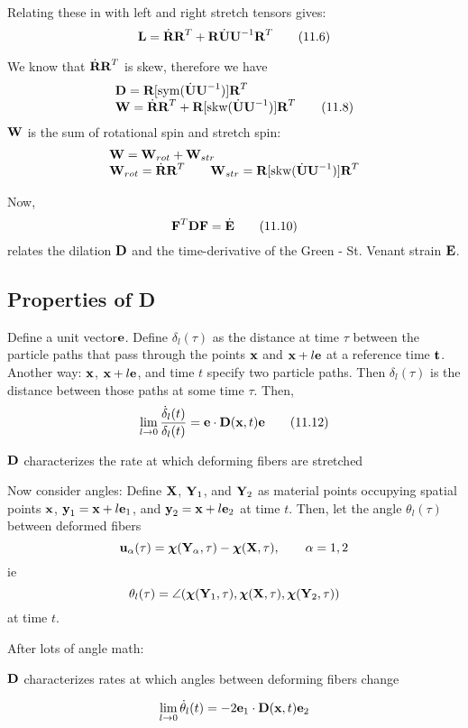 \documentclass{article}
\newcommand{\Chi}{\boldsymbol{\chi}}
\begin{document}
Relating these in with left and right stretch tensors gives:
\[
	\textbf{L} = \dot{\textbf{R}}\textbf{R}^T + \textbf{R}\dot{\textbf{U}}\textbf{U}^{-1}\textbf{R}^T\tag{11.6}
\]

We know that $\dot{\textbf{R}}\textbf{R}^T$ is skew, therefore we have
\[
\begin{array}{l}
	\textbf{D} = \textbf{R}[\text{sym}(\dot{\textbf{U}}\textbf{U}^{-1})]\textbf{R}^T\\
	\textbf{W} = \dot{\textbf{R}}\textbf{R}^T + \textbf{R}[\text{skw}(\dot{\textbf{U}}\textbf{U}^{-1})]\textbf{R}^T\tag{11.8}
\end{array}
\]
$\textbf{W}$ is the sum of rotational spin and stretch spin:
\[
\begin{array}{l}
	\textbf{W} = \textbf{W}_{rot} + \textbf{W}_{str}\\
	\textbf{W}_{rot} = \dot{\textbf{R}}\textbf{R}^T \qquad \textbf{W}_{str} = \textbf{R}[\text{skw}(\dot{\textbf{U}}\textbf{U}^{-1})]\textbf{R}^T
\end{array}
\]

Now,
\[
	\textbf{F}^T\textbf{D}\textbf{F} = \dot{\textbf{E}}\tag{11.10}
\]
relates the dilation $\textbf{D}$ and the time-derivative of the Green - St. Venant strain $\textbf{E}$.

\subsection{Properties of D}
Define a unit vector$\textbf{e}$. Define $\delta_l(\tau)$ as the distance at time $\tau$ between the particle paths that pass through the points $\textbf{x}$ and $\textbf{x} + l\textbf{e}$ at a reference time $\textbf{t}$. Another way: $\textbf{x}$, $\textbf{x} +l\textbf{e}$, and time $t$ specify two particle paths. Then $\delta_l(\tau)$ is the distance between those paths at some time $\tau$.
Then,
\[
	\lim\limits_{l\to 0}\frac{\dot{\delta}_l(t)}{\delta_l(t)} = \textbf{e}\cdot\textbf{D}(\textbf{x},t)\textbf{e}\tag{11.12}
\]
\begin{remark}
	$\textbf{D}$ characterizes the rate at which deforming fibers are stretched
\end{remark}

Now consider angles:
Define $\textbf{X}$, $\textbf{Y}_1$, and $\textbf{Y}_2$ as material points occupying spatial points $\textbf{x}$, $\textbf{y}_1= \textbf{x} + l\textbf{e}_1$, and $\textbf{y}_2 = \textbf{x} + l\textbf{e}_2$ at time $t$. Then, let the angle $\theta_l(\tau)$ between deformed fibers
\[
	\u_\alpha(\tau) = \Chi (\Y_\alpha, \tau ) - \Chi (\X, \tau ), \qquad \alpha = 1,2
\]
ie
\[
	\theta_l(\tau) = \angle(\Chi(\Y_1, \tau), \Chi(\X, \tau), \Chi(\Y_2, \tau))
\]
at time $t$.

After lots of angle math:
\begin{remark}
	$\textbf{D}$ characterizes rates at which angles between deforming fibers change
\end{remark}

\[
	\lim\limits_{l\to 0}\dot{\theta}_l(t) = -2\textbf{e}_1\cdot\textbf{D}(\textbf{x},t)\textbf{e}_2
\]
\end{document}
